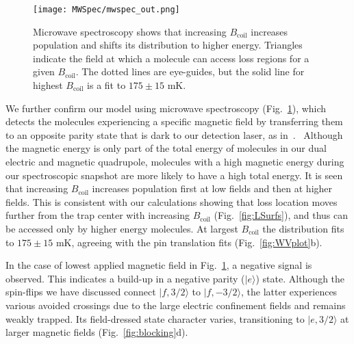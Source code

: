 \documentclass[%
 reprint,
 amsmath,amssymb,
 aps,
prl,
]{revtex4-1}
\newcommand{\bcl}{{$B_\text{coil}$}}
\newcommand{\cmnt}[1]{\ignorespaces}
\begin{document}
\begin{figure}[tb]
\texttt{[image: MWSpec/mwspec\_out.png]}%
\caption{
Microwave spectroscopy shows that increasing \bcl{} increases population and shifts its distribution to higher energy. Triangles indicate the field at which a molecule can access loss regions for a given \bcl. The dotted lines are eye-guides, but the solid line for highest \bcl{} is a fit to $175\pm15\text{ mK}$.
\label{fig:spec}}
\end{figure}

We further confirm our model using microwave spectroscopy (Fig.~\ref{fig:spec}), which detects the molecules experiencing a specific magnetic field by transferring them to an opposite parity state that is dark to our detection laser, as in~\cite{Stuhl2012evap}.\cmnt{, except here we turn off the electric trapping field just before the spectroscopy, which happens before any significant molecular motion. \cmnt{but with a microwave probe directly exciting free space modes of our vacuum chamber\cmnt{instead of a bias tee}.}}  ~Although the magnetic energy is only part of the total energy of molecules in our dual electric and magnetic quadrupole, molecules with a high magnetic energy during our spectroscopic snapshot are more likely to have a high total energy. It is seen that increasing \bcl{} increases population first at low fields and then at higher fields. This is consistent with our calculations showing that loss location moves further from the trap center with increasing \bcl{} (Fig.~\ref{fig:LSurfs}), and thus can be accessed only by higher energy molecules. At largest \bcl{} the distribution fits to $175\pm15\text{ mK}$, agreeing with the pin translation fits (Fig.~\ref{fig:WVplot}b).%


In the case of lowest applied magnetic field in Fig.~\ref{fig:spec}, a negative signal is observed. This indicates a build-up in a negative parity ($|e\rangle$) state. Although the spin-flips we have discussed connect $|f,3/2\rangle$ to $|f,-3/2\rangle$, the latter experiences various avoided crossings due to the large electric confinement fields and remains weakly trapped.  Its field-dressed state character varies, transitioning to $|e,3/2\rangle$ at larger magnetic fields (Fig.~\ref{fig:blocking}d). %
\end{document}
